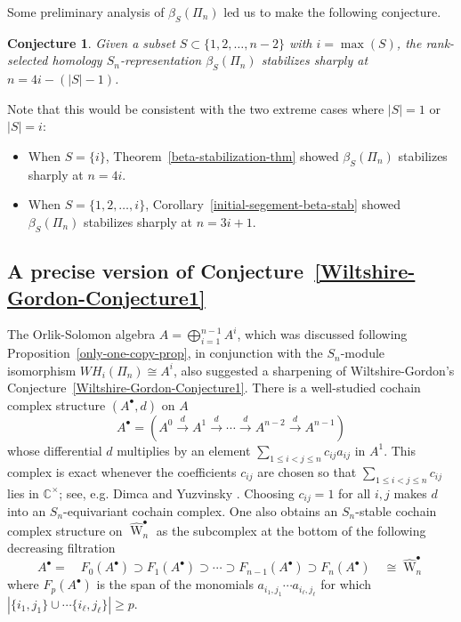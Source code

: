 \documentclass[12pt]{amsart}
\theoremstyle{plain}
\newtheorem{conj}[thm]{Conjecture}
\theoremstyle{definition}
\begin{document}
Some preliminary analysis of $\beta_S(\Pi_n)$ led us to make the following conjecture.

\begin{conj}
\label{beta-stabilization-conjecture}
Given a subset $S \subset \{1,2,\ldots,n-2\}$ with $i=\max(S)$,
the rank-selected homology 
$S_n$-representation $\beta_S(\Pi_n)$ stabilizes
sharply at $n=4i -(|S| - 1)$.
\end{conj}

Note that this would be consistent with the two extreme cases 
where $|S|=1$ or $|S|=i$:
\begin{itemize}
\item
When $S=\{i\}$, 
Theorem~\ref{beta-stabilization-thm} showed 
$\beta_S(\Pi_n)$ stabilizes sharply at $n=4i$.
\item
When $S=\{1,2,\ldots,i\}$, 
Corollary~\ref{initial-segement-beta-stab} showed 
$\beta_S(\Pi_n)$ stabilizes sharply at $n=3i+1$.
\end{itemize}

\subsection{A precise version of
Conjecture~\ref{Wiltshire-Gordon-Conjecture1}}

\label{cochain-complex-conj-remark}
The Orlik-Solomon algebra $A=\bigoplus_{i=1}^{n-1}A^i$,
which was discussed following 
Proposition~\ref{only-one-copy-prop},
in conjunction with the $S_n$-module isomorphism 
$WH_i(\Pi_n) \cong A^i$, also
suggested a
sharpening of Wiltshire-Gordon's 
Conjecture~\ref{Wiltshire-Gordon-Conjecture1}.
There is a well-studied cochain complex structure $(A^\bullet,d)$ on $A$
$$
A^\bullet
=(A^0 \overset{d}{\rightarrow} 
  A^1 \overset{d}{\rightarrow} \cdots
  \overset{d}{\rightarrow} A^{n-2} 
  \overset{d}{\rightarrow} A^{n-1}) 
$$
whose differential $d$ multiplies by an element
$\sum_{1\leq i<j \leq n} c_{ij} a_{ij}$ in $A^1$. 
This complex is exact whenever the coefficients $c_{ij}$
are chosen so that $\sum_{1\leq i<j \leq n} c_{ij}$ lies in ${{\mathbb C}}^\times$; 
see, e.g. Dimca and Yuzvinsky \cite[\S 5]{DimcaYuzvinsky}.
Choosing $c_{ij}=1$ for all $i,j$ makes $d$ into an
$S_n$-equivariant cochain complex.  One also obtains
an $S_n$-stable cochain complex structure on
$\widehat{{\operatorname{W}}}^\bullet_n$ as the subcomplex at the bottom of
the following decreasing filtration 
\begin{equation}
\label{OS-filtration}
A^\bullet
 = \quad F_{0}(A^\bullet) 
  \supset F_{1}(A^\bullet) 
  \supset \cdots 
  \supset F_{n-1}(A^\bullet)   
  \supset F_{n}(A^\bullet) \quad \cong \widehat{{\operatorname{W}}}^\bullet_n
\end{equation}
where $F_p(A^\bullet)$ is the span of the monomials
$a_{i_1,j_1} \cdots a_{i_\ell,j_\ell}$ for which 
$
|\{i_1,j_1\} \cup \cdots \{i_\ell,j_\ell\}| \geq p.
$
\end{document}
